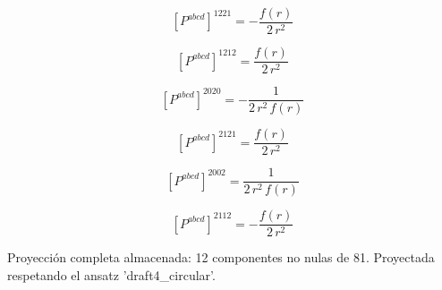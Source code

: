 \documentclass[11pt]{article}
\begin{document}
\begin{dmath*}[breakdepth={5}]
\left[P^{abcd}\right]^{1221} = -\frac{f\!\left(r\right)}{2\,{r}^{2}}
\end{dmath*}
\par\smallskip
\begin{dmath*}[breakdepth={5}]
\left[P^{abcd}\right]^{1212} = \frac{f\!\left(r\right)}{2\,{r}^{2}}
\end{dmath*}
\par\smallskip
\begin{dmath*}[breakdepth={5}]
\left[P^{abcd}\right]^{2020} = -\frac{1}{2\,{r}^{2}\,f\!\left(r\right)}
\end{dmath*}
\par\smallskip
\begin{dmath*}[breakdepth={5}]
\left[P^{abcd}\right]^{2121} = \frac{f\!\left(r\right)}{2\,{r}^{2}}
\end{dmath*}
\par\smallskip
\begin{dmath*}[breakdepth={5}]
\left[P^{abcd}\right]^{2002} = \frac{1}{2\,{r}^{2}\,f\!\left(r\right)}
\end{dmath*}
\par\smallskip
\begin{dmath*}[breakdepth={5}]
\left[P^{abcd}\right]^{2112} = -\frac{f\!\left(r\right)}{2\,{r}^{2}}
\end{dmath*}
\par\smallskip
Proyección completa almacenada: 12 componentes no nulas de 81. Proyectada respetando el ansatz 'draft4\_circular'.\par\medskip
{}
\end{document}
